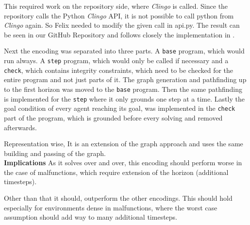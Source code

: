 This required work on the repository side, where \textit{Clingo} is called. Since the repository calls the Python \textit{Clingo} API, it is not possible to call python from \textit{Clingo} again. So Felix needed to modify the given call in api.py. The result can be seen in our GitHub Repository and follows closely the implementation in \cite{incr}.

Next the encoding was separated into three parts. A \texttt{base} program, which would run always. A \texttt{step} program, which would only be called if necessary and a \texttt{check}, which contains integrity constraints, which need to be checked for the entire program and not just parts of it. The graph generation and pathfinding up to the first horizon was moved to the \texttt{base} program. Then the same pathfinding is implemented for the \texttt{step} where it only grounds one step at a time. Lastly the goal condition of every agent reaching its goal, was implemented in the \texttt{check} part of the program, which is grounded before every solving and removed afterwards.

Representation wise, It is an extension of the graph approach and uses the same building and passing of the graph.\\

\noindent \textbf{Implications} As it solves over and over, this encoding should perform worse in the case of malfunctions, which require extension of the horizon (additional timesteps).

Other than that it should, outperform the other encodings. This should hold especially for environments dense in malfunctions, where the worst case assumption should add way to many additional timesteps.